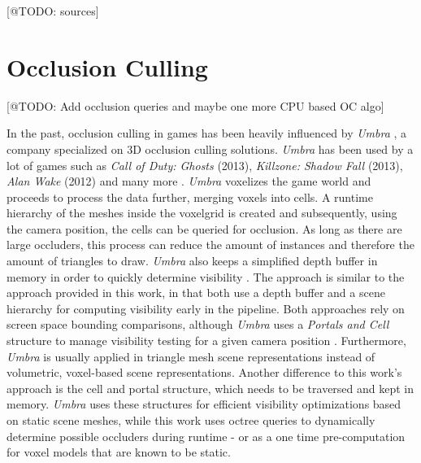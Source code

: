 [@TODO: sources]


\section*{Occlusion Culling}

[@TODO: Add occlusion queries and maybe one more CPU based OC algo]

In the past, occlusion culling in games has been heavily influenced by \emph{Umbra} \cite{Umbra2024}, a company 
specialized on 3D occlusion culling solutions. \emph{Umbra} has been used by a lot of games such as 
\emph{Call of Duty: Ghosts} (2013), \emph{Killzone: Shadow Fall} (2013), \emph{Alan Wake} (2012) and many more 
\cite{UmbraWiki,CallOfDutyGhostsCredits,KillzoneUmbra,AlanWakeUmbra}. \emph{Umbra} voxelizes the game world and proceeds 
to process the data further, merging voxels into cells. A runtime hierarchy of the meshes inside the voxelgrid is created 
and subsequently, using the camera position, the cells can be queried for occlusion. As long as there are large 
occluders, this process can reduce the amount of instances and therefore the amount of triangles to draw. \emph{Umbra} 
also keeps a simplified depth buffer in memory in order to quickly determine visibility \cite{Medium2018}. The 
approach is similar to the approach provided in this work, in that both use a depth buffer and a scene hierarchy for 
computing visibility early in the pipeline. Both approaches rely on screen space bounding comparisons, although 
\emph{Umbra} uses a \emph{Portals and Cell} structure to manage visibility testing for a given camera position 
\cite{Medium2018}. Furthermore, \emph{Umbra} is usually applied in triangle mesh scene representations instead of 
volumetric, voxel-based scene representations. Another difference to this work's approach is the cell and portal 
structure, which needs to be traversed and kept in memory. \emph{Umbra} uses these structures for efficient 
visibility optimizations based on static scene meshes, while this work uses octree queries to dynamically determine 
possible occluders during runtime - or as a one time pre-computation for voxel models that are known to be static. \\

